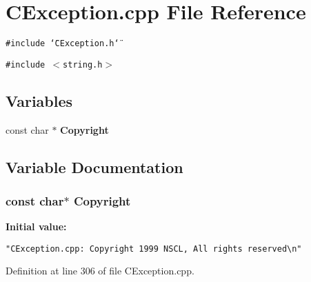 \section{CException.cpp File Reference}
\label{CException_8cpp}
{\tt \#include \char`\"{}CException.h\char`\"{}}\par
{\tt \#include $<$string.h$>$}\par
\subsection*{Variables}
\begin{CompactItemize}
\item 
const char $\ast$ {\bf Copyright}
\end{CompactItemize}


\subsection{Variable Documentation}
\subsubsection{\setlength{\rightskip}{0pt plus 5cm}const char$\ast$ Copyright\hspace{0.3cm}{\tt  [static]}}\label{CException_8cpp_a0}


{\bf Initial value:}

\footnotesize\begin{verbatim} 
"CException.cpp: Copyright 1999 NSCL, All rights reserved\n"\end{verbatim}\normalsize 


Definition at line 306 of file CException.cpp.